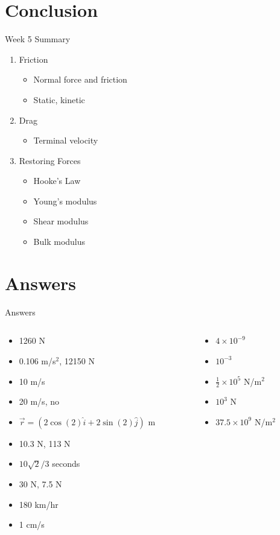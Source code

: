 \documentclass{beamer}
\begin{document}
\section{Conclusion}

\begin{frame}{Week 5 Summary}
\begin{enumerate}
\item \alert{Friction}
\begin{itemize}
\item Normal force and friction
\item Static, kinetic
\end{itemize}
\item \alert{Drag}
\begin{itemize}
\item Terminal velocity
\end{itemize}
\item \alert{Restoring Forces}
\begin{itemize}
\item Hooke's Law
\item Young's modulus
\item Shear modulus
\item Bulk modulus
\end{itemize}
\end{enumerate}
\end{frame}

\section{Answers}

\begin{frame}{Answers}
\begin{columns}[T]
\begin{column}{0.5\textwidth}
\begin{itemize}
\item 1260 N
\item 0.106 m/s$^2$, 12150 N
\item 10 m/s
\item 20 m/s, no
\item $\vec{r} = (2\cos(2)\hat{i} + 2\sin(2)\hat{j})$ m
\item 10.3 N, 113 N
\item $10\sqrt{2}/3$ seconds
\item 30 N, 7.5 N
\item 180 km/hr
\item 1 cm/s
\end{itemize}
\end{column}
\begin{column}{0.5\textwidth}
\begin{itemize}
\item $4 \times 10^{-9}$
\item $10^{-3}$
\item $\frac{1}{2} \times 10^{5}$ N/m$^2$
\item $10^{3}$ N
\item $37.5 \times 10^{9}$ N/m$^2$ 
\end{itemize}
\end{column}
\end{columns}
\end{frame}
\end{document}
